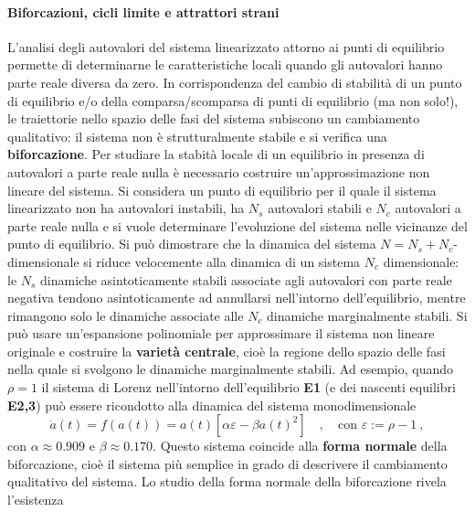\paragraph{Biforcazioni, cicli limite e attrattori strani}
L'analisi degli autovalori del sistema linearizzato attorno ai punti di equilibrio permette di 
 determinarne le caratteristiche locali quando gli autovalori hanno parte reale diversa
 da zero. In corrispondenza del cambio di stabilità di un punto di equilibrio e/o della 
 comparsa/scomparsa di punti di equilibrio (ma non solo!), le traiettorie nello spazio delle
 fasi del sistema subiscono un cambiamento qualitativo: il sistema non è strutturalmente stabile
 e si verifica una \textbf{biforcazione}.
\newline
Per studiare la stabità locale di un equilibrio in presenza di autovalori a parte reale nulla
 è necessario costruire un'approssimazione non lineare del sistema. Si considera un punto di equilibrio
 per il quale il sistema linearizzato non ha autovalori instabili, ha $N_s$ autovalori stabili e 
 $N_c$ autovalori a parte reale nulla e si vuole determinare l'evoluzione del sistema nelle
 vicinanze del punto di equilibrio.
Si può dimostrare che la dinamica del sistema $N=N_s+N_c$-dimensionale si riduce velocemente
 alla dinamica di un sistema $N_c$ dimensionale: le $N_s$ dinamiche asintoticamente stabili
 associate agli autovalori con parte reale negativa tendono asintoticamente ad annullarsi
 nell'intorno dell'equilibrio, mentre rimangono solo le dinamiche associate alle $N_c$ 
 dinamiche marginalmente stabili.
\newline
Si può usare un'espansione polinomiale per approssimare il sistema non lineare originale e
 costruire la \textbf{varietà centrale}, cioè la regione dello spazio delle fasi nella quale
 si svolgono le dinamiche marginalmente stabili.
\newline
\noindent 
Ad esempio, quando $\rho = 1$ il sistema di Lorenz nell'intorno dell'equilibrio \textbf{E1} (e
 dei nascenti equilibri \textbf{E2,3}) può essere ricondotto alla dinamica del sistema monodimensionale
\begin{equation}\label{eqn:lorenz:pitchfork}
 \dot{a}(t) = f(a(t)) = a(t) [ \alpha \varepsilon - \beta a(t)^2 ] \quad , \quad
 \text{con } \varepsilon := \rho-1 \ ,
\end{equation}
con $\alpha \approx 0.909$ e $\beta \approx 0.170$. Questo sistema coincide alla \textbf{forma
 normale} della biforcazione, cioè il sistema più semplice in grado di descrivere il cambiamento
 qualitativo del sistema. Lo studio della forma normale della biforcazione rivela l'esistenza

